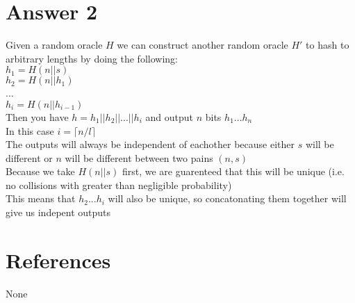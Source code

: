 \documentclass[11pt]{article}
\theoremstyle{definition}
\begin{document}
\section*{Answer 2}
Given a random oracle $H$ we can construct another random oracle $H'$ to hash to arbitrary lengths by doing the following:\\
$h_1 = H(n || s)$\\
$h_2 = H(n || h_1)$\\
...\\
$h_i = H(n || h_{i-1})$\\
Then you have $h = h_1||h_2||...||h_i$ and output $n$ bits $h_1...h_n$\\
In this case $i = \lceil n/l \rceil$\\
The outputs will always be independent of eachother because either $s$ will be different or $n$ will be different  between two pains $(n,s)$\\
Because we take $H(n||s)$ first, we are guarenteed that this will be unique (i.e. no collisions with greater than negligible probability)\\
This means that $h_2...h_i$ will also be unique, so concatonating them together will give us indepent outputs

\noindent\hrulefill


\section*{References}

None
\end{document}
